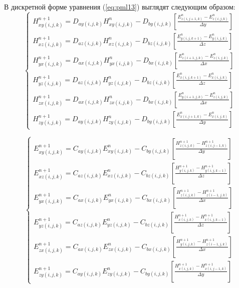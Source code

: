 В дискретной форме уравнения (\ref{eq:pml13}) выглядят следующим образом:
\begin{equation}
\left\{
\begin{aligned}
H_{xy (i,j,k)}^{n+1} = D_{ay (i,j,k)} H_{xy (i,j,k)}^{n} - D_{by (i,j,k)}
\left[
    \frac{E_{z (i,j+1,k)}^n - E_{z (i,j,k)}^n}{\Delta y}
\right] \\
H_{xz (i,j,k)}^{n+1} = D_{az (i,j,k)} H_{xz (i,j,k)}^{n} - D_{bz (i,j,k)}
\left[
    \frac{E_{y (i,j,k+1)}^n - E_{y (i,j,k)}^n}{\Delta z}
\right] \\
H_{yx (i,j,k)}^{n+1} = D_{ax (i,j,k)} H_{yx (i,j,k)}^{n} - D_{bx (i,j,k)}
\left[
    \frac{E_{z (i+1,j,k)}^n - E_{z (i,j,k)}^n}{\Delta x}
\right] \\
H_{yz (i,j,k)}^{n+1} = D_{az (i,j,k)} H_{yz (i,j,k)}^{n} - D_{bz (i,j,k)}
\left[
    \frac{E_{x (i,j,k+1)}^n - E_{x (i,j,k)}^n}{\Delta z}
\right] \\
H_{zx (i,j,k)}^{n+1} = D_{ax (i,j,k)} H_{zx (i,j,k)}^{n} - D_{bx (i,j,k)}
\left[
    \frac{E_{y (i+1,j,k)}^n - E_{z (i,j,k)}^n}{\Delta x}
\right] \\
H_{zy (i,j,k)}^{n+1} = D_{ay (i,j,k)} H_{zy (i,j,k)}^{n} - D_{by (i,j,k)}
\left[
    \frac{E_{x (i,j+1,k)}^n - E_{x (i,j,k)}^n}{\Delta y}
\right]
\end{aligned}
\right.
\end{equation}

\begin{equation}
\left\{
\begin{aligned}
E_{xy (i,j,k)}^{n+1} = C_{ay (i,j,k)} E_{xy (i,j,k)}^{n} - C_{by (i,j,k)}
\left[
    \frac{H_{z (i,j,k)}^{n+1} - H_{z (i,j-1,k)}^{n+1}}{\Delta y}
\right] \\
E_{xz (i,j,k)}^{n+1} = C_{az (i,j,k)} E_{xz (i,j,k)}^{n} - C_{bz (i,j,k)}
\left[
    \frac{H_{y (i,j,k)}^{n+1} - H_{y (i,j,k-1)}^{n+1}}{\Delta z}
\right] \\
E_{yx (i,j,k)}^{n+1} = C_{ax (i,j,k)} E_{yx (i,j,k)}^{n} - C_{bx (i,j,k)}
\left[
    \frac{H_{z (i,j,k)}^{n+1} - H_{z (i-1,j,k)}^{n+1}}{\Delta x}
\right] \\
E_{yz (i,j,k)}^{n+1} = C_{az (i,j,k)} E_{yz (i,j,k)}^{n} - C_{bz (i,j,k)}
\left[
    \frac{H_{x (i,j,k)}^{n+1} - H_{x (i,j,k-1)}^{n+1}}{\Delta z}
\right] \\
E_{zx (i,j,k)}^{n+1} = C_{ax (i,j,k)} E_{zx (i,j,k)}^{n} - C_{bx (i,j,k)}
\left[
    \frac{H_{y (i,j,k)}^{n+1} - H_{z (i-1,j,k)}^{n+1}}{\Delta x}
\right] \\
E_{zy (i,j,k)}^{n+1} = C_{ay (i,j,k)} E_{zy (i,j,k)}^{n} - C_{by (i,j,k)}
\left[
    \frac{H_{x (i,j,k)}^{n+1} - H_{x (i,j-1,k)}^{n+1}}{\Delta y}
\right]
\end{aligned}
\right.
\end{equation}

